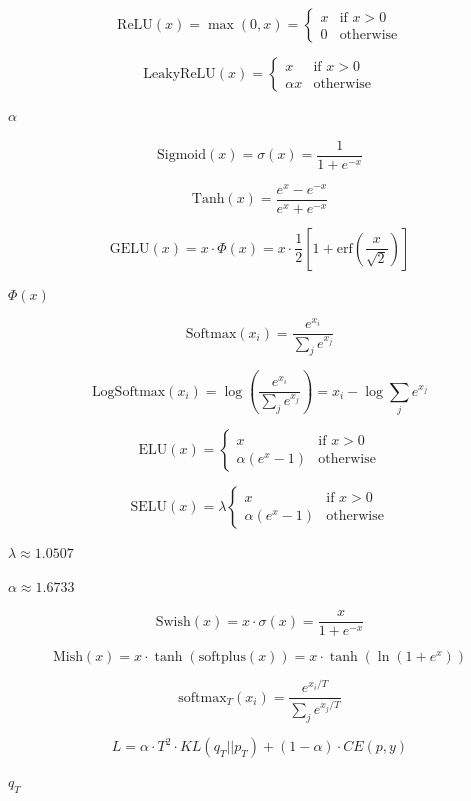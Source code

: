 \documentclass{article}
\begin{document}
\[\text{ReLU}(x) = \max(0, x) = \begin{cases}
  x & \text{if } x > 0 \\
  0 & \text{otherwise}
\end{cases}
\]
\pagebreak

\[\text{LeakyReLU}(x) = \begin{cases}
  x & \text{if } x > 0 \\
  \alpha x & \text{otherwise}
\end{cases}
\]
\pagebreak

$\alpha$
\pagebreak

\[\text{Sigmoid}(x) = \sigma(x) = \frac{1}{1 + e^{-x}}
\]
\pagebreak

\[\text{Tanh}(x) = \frac{e^x - e^{-x}}{e^x + e^{-x}}
\]
\pagebreak

\[\text{GELU}(x) = x \cdot \Phi(x) = x \cdot \frac{1}{2}\left[1 + \text{erf}\left(\frac{x}{\sqrt{2}}\right)\right]
\]
\pagebreak

$\Phi(x)$
\pagebreak

\[\text{Softmax}(x_i) = \frac{e^{x_i}}{\sum_j e^{x_j}}
\]
\pagebreak

\[\text{LogSoftmax}(x_i) = \log\left(\frac{e^{x_i}}{\sum_j e^{x_j}}\right) = x_i - \log\sum_j e^{x_j}
\]
\pagebreak

\[\text{ELU}(x) = \begin{cases}
  x & \text{if } x > 0 \\
  \alpha(e^x - 1) & \text{otherwise}
\end{cases}
\]
\pagebreak

\[\text{SELU}(x) = \lambda \begin{cases}
  x & \text{if } x > 0 \\
  \alpha(e^x - 1) & \text{otherwise}
\end{cases}
\]
\pagebreak

$\lambda \approx 1.0507$
\pagebreak

$\alpha \approx 1.6733$
\pagebreak

\[\text{Swish}(x) = x \cdot \sigma(x) = \frac{x}{1 + e^{-x}}
\]
\pagebreak

\[\text{Mish}(x) = x \cdot \tanh(\text{softplus}(x)) = x \cdot \tanh(\ln(1 + e^x))
\]
\pagebreak

\[\text{softmax}_T(x_i) = \frac{e^{x_i/T}}{\sum_j e^{x_j/T}}
\]
\pagebreak

\[L = \alpha \cdot T^2 \cdot KL(q_T || p_T) + (1-\alpha) \cdot CE(p, y)
\]
\pagebreak

$q_T$
\pagebreak
\end{document}
